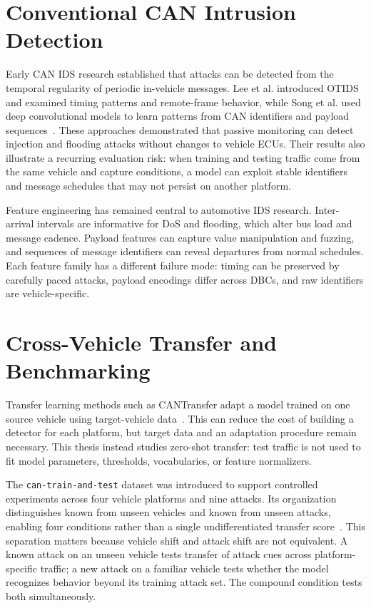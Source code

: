 \documentclass[12pt, a4paper, reqno, oneside]{book}
\begin{document}
\section{Conventional CAN Intrusion Detection}
\label{sec:rw_conventional}
Early CAN IDS research established that attacks can be detected from the temporal regularity of periodic in-vehicle messages. Lee et al. introduced OTIDS and examined timing patterns and remote-frame behavior, while Song et al. used deep convolutional models to learn patterns from CAN identifiers and payload sequences~\cite{lee2017otids,song2020invehicle,song2020dcnn}. These approaches demonstrated that passive monitoring can detect injection and flooding attacks without changes to vehicle ECUs. Their results also illustrate a recurring evaluation risk: when training and testing traffic come from the same vehicle and capture conditions, a model can exploit stable identifiers and message schedules that may not persist on another platform.

Feature engineering has remained central to automotive IDS research. Inter-arrival intervals are informative for DoS and flooding, which alter bus load and message cadence. Payload features can capture value manipulation and fuzzing, and sequences of message identifiers can reveal departures from normal schedules. Each feature family has a different failure mode: timing can be preserved by carefully paced attacks, payload encodings differ across DBCs, and raw identifiers are vehicle-specific.

\section{Cross-Vehicle Transfer and Benchmarking}
\label{sec:rw_transfer}
Transfer learning methods such as CANTransfer adapt a model trained on one source vehicle using target-vehicle data~\cite{tariq2020cantransfer}. This can reduce the cost of building a detector for each platform, but target data and an adaptation procedure remain necessary. This thesis instead studies zero-shot transfer: test traffic is not used to fit model parameters, thresholds, vocabularies, or feature normalizers.

The \texttt{can-train-and-test} dataset was introduced to support controlled experiments across four vehicle platforms and nine attacks. Its organization distinguishes known from unseen vehicles and known from unseen attacks, enabling four conditions rather than a single undifferentiated transfer score~\cite{lampe2023cantrain,lampe2024curated}. This separation matters because vehicle shift and attack shift are not equivalent. A known attack on an unseen vehicle tests transfer of attack cues across platform-specific traffic; a new attack on a familiar vehicle tests whether the model recognizes behavior beyond its training attack set. The compound condition tests both simultaneously.
\end{document}

